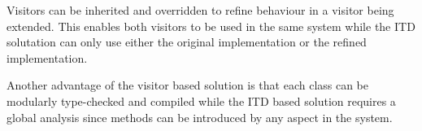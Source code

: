 Visitors can be inherited and overridden to refine behaviour in a visitor
being extended. This enables both visitors to be used in the same system
while the ITD solutation can only use either the original implementation 
or the refined implementation. 

Another advantage of the visitor based solution is that each class can be
modularly type-checked and compiled while the ITD based solution requires a
global analysis since methods can be introduced by any aspect in the
system.
